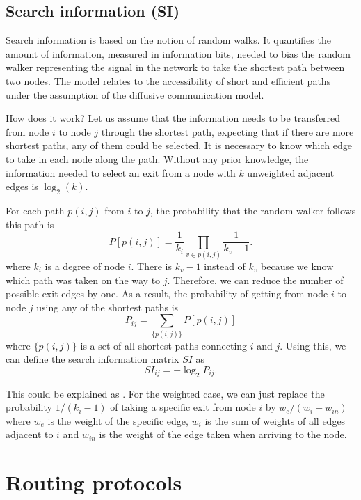 \subsection{Search information (SI)}

Search information is based on the notion of random walks. It quantifies the amount of information, measured in information bits, needed to bias the random walker representing the signal in the network to take the shortest path between two nodes. The model relates to the accessibility of short and efficient paths under the assumption of the diffusive communication model. \cite{seguin_communication_2023,seguin_brain_2023}

How does it work? Let us assume that the information needs to be transferred from node $i$ to node $j$ through the shortest path, expecting that if there are more shortest paths, any of them could be selected. It is necessary to know which edge to take in each node along the path. Without any prior knowledge, the information needed to select an exit from a node with $k$ unweighted adjacent edges is $\log_2(k)$. \cite{rosvall_searchability_2005,rosvall_networks_2005}

For each path $p(i,j)$ from $i$ to $j$, the probability that the random walker follows this path is 
$$
P[p(i,j)] = \frac{1}{k_i}\prod_{v \in p(i,j)}\frac{1}{k_v-1}.
$$
where $k_i$ is a degree of node $i$. There is $k_v-1$ instead of $k_v$ because we know which path was taken on the way to $j$. Therefore, we can reduce the number of possible exit edges by one. As a result, the probability of getting from node $i$ to node $j$ using any of the shortest paths is 
$$
P_{ij} = \sum_{\{p(i,j)\}}P[p(i,j)] 
$$
where $\{p(i,j)\}$ is a set of all shortest paths connecting $i$ and $j$. Using this, we can define the search information matrix $SI$ as 
$$
SI_{ij}=-\log_2 P_{ij}.
$$

This could be explained as . For the weighted case, we can just replace the probability $1/(k_i-1)$ of taking a specific exit from node $i$ by $w_e/(w_i-w_{in})$ where $w_e$ is the weight of the specific edge, $w_i$ is the sum of weights of all edges adjacent to $i$ and $w_{in}$ is the weight of the edge taken when arriving to the node. 

\section{Routing protocols}

